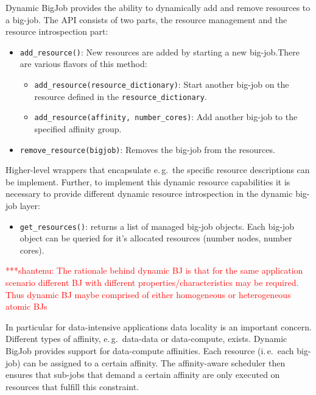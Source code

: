 \documentclass[conference,final]{IEEEtran}
\newcommand{\jhanote}[1]{ {\textcolor{red} { ***shantenu: #1 }}}
\newcommand{\jhanote}[1]{}
\begin{document}
Dynamic BigJob provides the ability to dynamically add and remove resources to a 
big-job. The API consists of two parts, the resource management and the resource 
introspection part:
\begin{itemize}
    \item \texttt{add\_resource()}: New resources are added by starting a new
    big-job.There are various flavors of this method:
    \begin{itemize}
        \item \texttt{add\_resource(re\-sour\-ce\_dic\-tionary)}: Start another big-job on the resource defined in the \texttt{resource\_dictionary}.
        \item \texttt{add\_resource(affinity, number\_cores)}: Add another big-job to the specified affinity group.
    \end{itemize}
    \item \texttt{remove\_resource(bigjob)}: Removes the big-job from the
    resources.
\end{itemize}

Higher-level wrappers that encapsulate e.\,g.\ the specific resource
descriptions can be implement. Further, to implement this dynamic resource
capabilities it is necessary to provide different dynamic resource introspection
in the dynamic big-job layer:
\begin{itemize}
    \item \texttt{get\_resources()}: returns a list of managed big-job objects.
     Each big-job object can be queried for it's allocated resources (number 
     nodes, number cores).
\end{itemize}



\jhanote{The rationale behind dynamic BJ is that for the same
  application scenario different BJ with different
  properties/characteristics may be required. Thus dynamic BJ maybe
  comprised of either homogeneous or heterogeneous atomic BJs}

In particular for data-intensive applications data locality is an important
concern. Different types of affinity, e.\,g.\ data-data or data-compute, exists.
Dynamic BigJob provides support for data-compute affinities. Each resource
(i.\,e.\ each big-job) can be assigned to a certain affinity. The affinity-aware
scheduler then ensures that sub-jobs that demand a certain affinity are only
executed on resources that fulfill this constraint.
\end{document}
